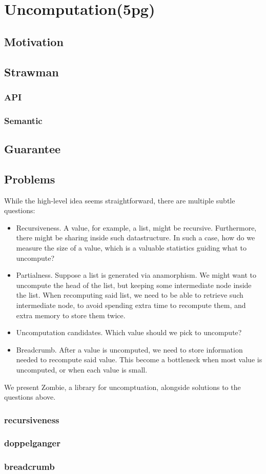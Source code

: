 \section{Uncomputation(5pg)}
\subsection{Motivation}
\subsection{Strawman}
\subsubsection{API}
\subsubsection{Semantic}
\subsection{Guarantee}
\subsection{Problems}
While the high-level idea seems straightforward, there are multiple subtle questions: 
\begin{itemize}
	\item Recursiveness. A value, for example, a list, might be recursive. Furthermore, there might be sharing inside such datastructure. In such a case, how do we measure the size of a value, which is a valuable statistics guiding what to uncompute?
	\item Partialness. Suppose a list is generated via anamorphism. We might want to uncompute the head of the list, but keeping some intermediate node inside the list.
	When recomputing said list, we need to be able to retrieve such intermediate node, to
	avoid spending extra time to recompute them, and extra memory to store them twice.
	\item Uncomputation candidates. Which value should we pick to uncompute?
	\item Breadcrumb. After a value is uncomputed, we need to store information needed to recompute said value. This become a bottleneck when most value is uncomputed, or when each value is small.
\end{itemize}

We present Zombie, a library for uncomptuation, alongside solutions to the questions above.
\subsubsection{recursiveness}
\subsubsection{doppelganger}
\subsubsection{breadcrumb}
